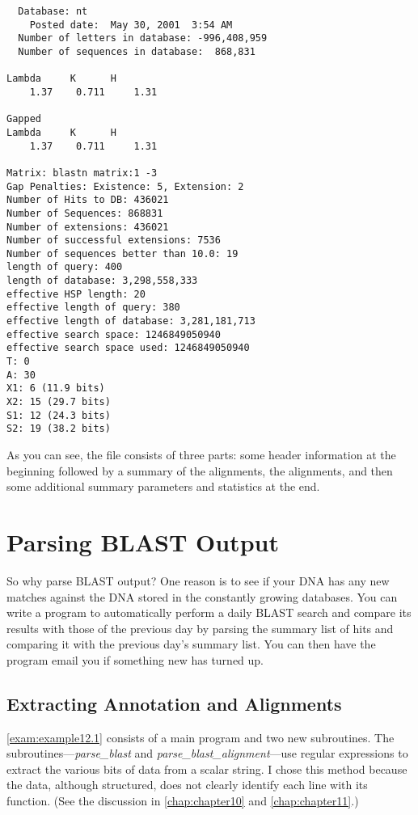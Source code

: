 \begin{lstlisting}
  Database: nt
    Posted date:  May 30, 2001  3:54 AM
  Number of letters in database: -996,408,959
  Number of sequences in database:  868,831

Lambda     K      H
    1.37    0.711     1.31

Gapped
Lambda     K      H
    1.37    0.711     1.31

Matrix: blastn matrix:1 -3
Gap Penalties: Existence: 5, Extension: 2
Number of Hits to DB: 436021
Number of Sequences: 868831
Number of extensions: 436021
Number of successful extensions: 7536
Number of sequences better than 10.0: 19
length of query: 400
length of database: 3,298,558,333
effective HSP length: 20
effective length of query: 380
effective length of database: 3,281,181,713
effective search space: 1246849050940
effective search space used: 1246849050940
T: 0
A: 30
X1: 6 (11.9 bits)
X2: 15 (29.7 bits)
S1: 12 (24.3 bits)
S2: 19 (38.2 bits)
\end{lstlisting}

As you can see, the file consists of three parts: some header information at the beginning followed by a summary of the alignments, the alignments, and then some additional summary parameters and statistics at the end. 

\section{Parsing BLAST Output}
So why parse BLAST output? One reason is to see if your DNA has any new matches against the DNA stored in the constantly growing databases. You can write a program to automatically perform a daily BLAST search and compare its results with those of the previous day by parsing the summary list of hits and comparing it with the previous day's summary list. You can then have the program email you if something new has turned up. 

\subsection{Extracting Annotation and Alignments}
\autoref{exam:example12.1} consists of a main program and two new subroutines. The subroutines—\textit{parse\_blast} and \textit{parse\_blast\_alignment}—use regular expressions to extract the various bits of data from a scalar string. I chose this method because the data, although structured, does not clearly identify each line with its function. (See the discussion in \autoref{chap:chapter10} and \autoref{chap:chapter11}.) 

